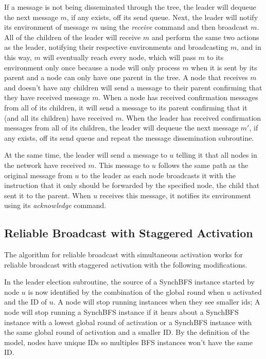 \documentclass[english]{article}
\begin{document}
If a message is not being disseminated through the tree, the leader will dequeue the next message $m$, if any exists, off its send queue. Next, the leader will notify its environment of message $m$ using the \textit{receive} command and then broadcast $m$. All of the children of the leader will receive $m$ and perform the same two actions as the leader, notifying their respective environments and broadcasting $m$, and in this way, $m$ will eventually reach every node, which will pass $m$ to its environment only once because a node will only process $m$ when it is sent by its parent and a node can only have one parent in the tree. A node that receives $m$ and doesn't have any children will send a message to their parent confirming that they have received message $m$. When a node has received confirmation messages from all of its children, it will send a message to its parent confirming that it (and all its children) have received $m$. When the leader has received confirmation messages from all of its children, the leader will dequeue the next message $m'$, if any exists, off its send queue and repeat the message dissemination subroutine. 

At the same time, the leader will send a message to $u$ telling it that all nodes in the network have received $m$. This message to $u$ follows the same path as the original message from $u$ to the leader as each node broadcasts it with the instruction that it only should be forwarded by the specified node, the child that sent it to the parent. When $u$ receives this message, it notifies its environment using its \textit{acknowledge} command.


  \subsection {Reliable Broadcast with Staggered Activation}

The algorithm for reliable broadcast with simultaneous activation works for reliable broadcast with staggered activation with the following modifications.

In the leader election subroutine, the source of a SynchBFS instance started by node $u$ is now identified by the combination of the global round when $u$ activated and the ID of $u$. A node will stop running instances when they see smaller ids; A node will stop running a SynchBFS instance if it hears about a SynchBFS instance with a lowest global round of activation or a SynchBFS instance with the same global round of activation and a smaller ID. By the definition of the model, nodes have unique IDs so multiples BFS instances won't have the same ID.
\end{document}
